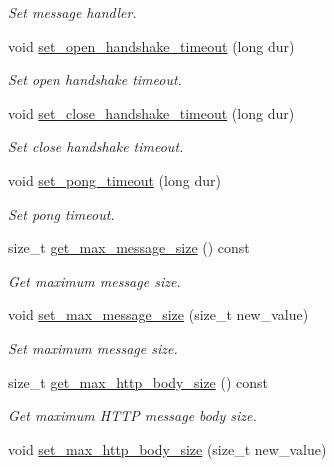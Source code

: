 \begin{DoxyCompactItemize}
\begin{DoxyCompactList}\small\item\em Set message handler. \end{DoxyCompactList}\item 
void \hyperlink{classwebsocketpp_1_1connection_ad5a666fe1144dc68b1bae3bcc615e1ed}{set\+\_\+open\+\_\+handshake\+\_\+timeout} (long dur)
\begin{DoxyCompactList}\small\item\em Set open handshake timeout. \end{DoxyCompactList}\item 
void \hyperlink{classwebsocketpp_1_1connection_a3bf932388a128a7b719c45b945bffaad}{set\+\_\+close\+\_\+handshake\+\_\+timeout} (long dur)
\begin{DoxyCompactList}\small\item\em Set close handshake timeout. \end{DoxyCompactList}\item 
void \hyperlink{classwebsocketpp_1_1connection_ab9a905ac6a4f0f8546011b8f8a531563}{set\+\_\+pong\+\_\+timeout} (long dur)
\begin{DoxyCompactList}\small\item\em Set pong timeout. \end{DoxyCompactList}\item 
size\+\_\+t \hyperlink{classwebsocketpp_1_1connection_ae2169d7637ad3d31d8c24c2c498b8db8}{get\+\_\+max\+\_\+message\+\_\+size} () const 
\begin{DoxyCompactList}\small\item\em Get maximum message size. \end{DoxyCompactList}\item 
void \hyperlink{classwebsocketpp_1_1connection_a522286bf83373f87ddebf93b732abffc}{set\+\_\+max\+\_\+message\+\_\+size} (size\+\_\+t new\+\_\+value)
\begin{DoxyCompactList}\small\item\em Set maximum message size. \end{DoxyCompactList}\item 
size\+\_\+t \hyperlink{classwebsocketpp_1_1connection_a7b045ae56e2eb1f60a536af4818bbc0d}{get\+\_\+max\+\_\+http\+\_\+body\+\_\+size} () const 
\begin{DoxyCompactList}\small\item\em Get maximum H\+T\+T\+P message body size. \end{DoxyCompactList}\item 
void \hyperlink{classwebsocketpp_1_1connection_ad2a5b06ad88f5bcdd06fcabaae3323bc}{set\+\_\+max\+\_\+http\+\_\+body\+\_\+size} (size\+\_\+t new\+\_\+value)

\end{DoxyCompactItemize}
